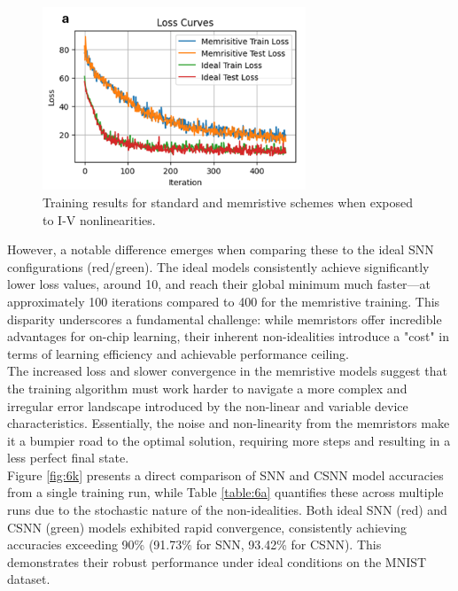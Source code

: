 \begin{figure}[htbp!] 
    \centering    
    \includegraphics[width=0.7\textwidth]{Chapter6/Figs/j.png}
    \caption[Training results for standard and memristive schemes when exposed to I-V nonlinearities.]{Training results for standard and memristive schemes when exposed to I-V nonlinearities.}
    \label{fig:6j}
\end{figure}

\noindent However, a notable difference emerges when comparing these to the ideal SNN configurations (red/green). The ideal models consistently achieve significantly lower loss values, around 10, and reach their global minimum much faster—at approximately 100 iterations compared to 400 for the memristive training. This disparity underscores a fundamental challenge: while memristors offer incredible advantages for on-chip learning, their inherent non-idealities introduce a "cost" in terms of learning efficiency and achievable performance ceiling. \\

\noindent The increased loss and slower convergence in the memristive models suggest that the training algorithm must work harder to navigate a more complex and irregular error landscape introduced by the non-linear and variable device characteristics. Essentially, the noise and non-linearity from the memristors make it a bumpier road to the optimal solution, requiring more steps and resulting in a less perfect final state.\\

\noindent Figure \ref{fig:6k} presents a direct comparison of SNN and CSNN model accuracies from a single training run, while Table \ref{table:6a} quantifies these across multiple runs due to the stochastic nature of the non-idealities. Both ideal SNN (red) and CSNN (green) models exhibited rapid convergence, consistently achieving accuracies exceeding 90\% (91.73\% for SNN, 93.42\% for CSNN). This demonstrates their robust performance under ideal conditions on the MNIST dataset.\\

